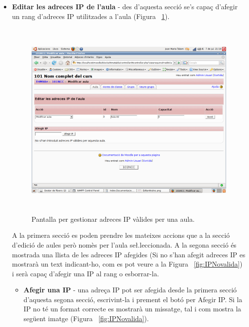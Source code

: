 \documentclass[a4paper]{report}  %
\begin{document}
\begin{itemize}
\item\textbf{Editar les adreces IP de l'aula} - des d'aquesta secció se's capaç d'afegir un rang d'adreces IP utilitzades a l'aula (Figura ~\ref{fig:EditantAdrecesIP}). 
		\begin{figure}[H] %
		\begin{center}
		\includegraphics[height=10cm,width=12cm]{img/EditantAdrecesIP.png}
		\caption[List caption]{Pantalla per gestionar adreces IP vàlides per una aula.}
		\label{fig:EditantAdrecesIP}
		\end{center}
		\end{figure}
A la primera secció es poden prendre les mateixes accions que a la secció d'edició de aules però nomès per l'aula se\l.leccionada. A la segona secció és mostrada una llista de les adreces IP afegides (Si no s'han afegit adreces IP es mostrarà un text indicant-ho, com es pot veure a la Figura ~\ref{fig:IPNovalida}) i serà capaç d'afegir una IP al rang o esborrar-la. 
	\begin{itemize}
	\item\textbf{Afegir una IP} - una adreça IP pot ser afegida desde la primera secció d'aquesta segona secció, escrivint-la i prement el botó per Afegir IP. Si la IP no té un format correcte es mostrarà un missatge, tal i com mostra la següent imatge (Figura ~\ref{fig:IPNovalida}).
		\begin{figure}[H] %
		\begin{center}

\end{center}
\end{figure}
\end{itemize}
\end{itemize}
\end{document}
